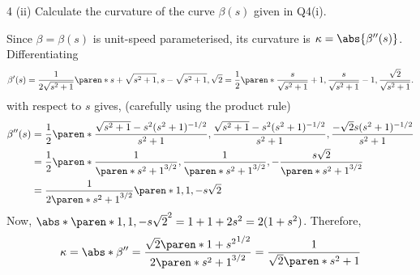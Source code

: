 \documentclass[11pt]{penrose}
\begin{document}
\begin{problem}{4 (ii)}
    Calculate the curvature of the curve $\beta(s)$ given in Q4(i).

    \solution Since $\beta = \beta(s)$ is unit-speed parameterised, its curvature is $\kappa = \abs{\beta''(s)}$. Differentiating
    \begin{equation*}
        \beta'(s)
        = \frac{1}{2\sqrt{s^2 + 1}}
        \paren*{s + \sqrt{s^2 + 1}, s - \sqrt{s^2 + 1}, \sqrt{2} }
        = \frac{1}{2}
        \paren*{\frac{s}{\sqrt{s^2 + 1}} + 1, \frac{s}{\sqrt{s^2 + 1}} - 1, \frac{\sqrt{2}}{\sqrt{s^2 + 1}} }.
    \end{equation*}
    with respect to $s$ gives, (carefully using the product rule)
    \begin{align*}
        \beta''(s)
        &= \frac{1}{2}
        \paren*{
            \frac{\sqrt{s^2 + 1} - s^2 (s^2 + 1)^{-1/2}}{s^2 + 1},
            \frac{\sqrt{s^2 + 1} - s^2 (s^2 + 1)^{-1/2}}{s^2 + 1},
            \frac{- \sqrt{2} s (s^2 + 1)^{-1/2}}{s^2 + 1}
        }\\
        &= \frac{1}{2}
        \paren*{
            \frac{1}{\paren*{s^2 + 1}^{3/2}},
            \frac{1}{\paren*{s^2 + 1}^{3/2}},
            -\frac{s\sqrt{2}}{\paren*{s^2 + 1}^{3/2}}
        }\\
        &= \frac{1}{2 \paren*{s^2 + 1}^{3/2}} \paren*{ 1, 1, -s\sqrt{2}}
    \end{align*}
    Now, $\abs*{\paren*{ 1, 1, -s\sqrt{2}}}^2 = 1 + 1 + 2s^2 = 2 (1 + s^2)$. Therefore,
    \begin{equation*}
        \kappa
        = \abs*{\beta''}
        = \frac{\sqrt{2} \paren*{ 1 + s^2 }^{1/2}}{2 \paren*{s^2 + 1}^{3/2}}
        = \frac{1}{\sqrt{2} \paren*{s^2 + 1}}
    \end{equation*}
\end{problem}
\end{document}
